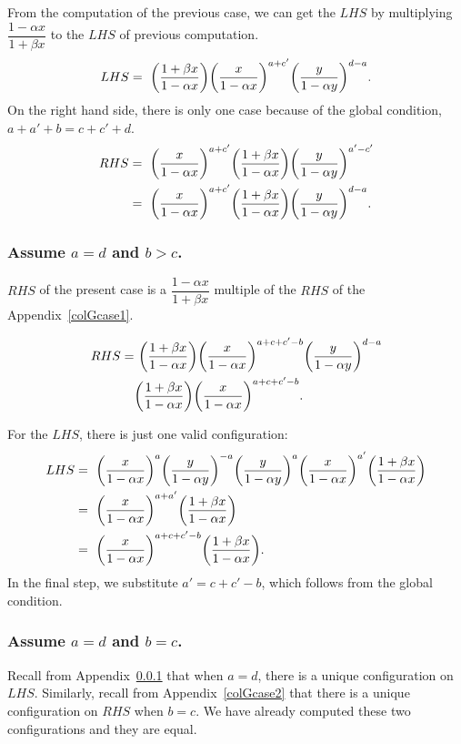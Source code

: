 \documentclass[ALCO, Unicode]{cedram}
\DeclarePairedDelimiter\autobracket{(}{)}
\newcommand{\br}[1]{\autobracket*{#1}}
\begin{document}
From the computation of the previous case, we can get the $LHS$ by multiplying $\dfrac{1-\alpha x}{1+\beta x}$ to the $LHS$ of previous computation.
\[
LHS= \text{ }\br{\dfrac{1+\beta x}{1-\alpha x}} \br{\dfrac{x}{1-\alpha x}}^{a+c'}\br{\dfrac{y}{1-\alpha y}}^{d-a}.
\]
On the right hand side, there is only one case because of the global condition, $a+a'+b=c+c'+d$.
\begin{align*}
RHS=\text{ }&\br{\dfrac{x}{1-\alpha x}}^{a+c'}\br{\dfrac{1+\beta x}{1-\alpha x}}\br{\dfrac{y}{1-\alpha y}}^{a'-c'}\\
    =\text{ }&\br{\dfrac{x}{1-\alpha x}}^{a+c'}\br{\dfrac{1+\beta x}{1-\alpha x}}\br{\dfrac{y}{1-\alpha y}}^{d-a}.
\end{align*}

\subsubsection{Assume \texorpdfstring{$a=d$ and $b>c$}{a=d and b>c}.}
\label{colGcase3}
 $RHS$ of the present case is a $\dfrac{1-\alpha x}{1+\beta x}$ multiple of the $RHS$ of the Appendix~\ref{colGcase1}.


\begin{align*}
RHS=&  \text{ } \br{\dfrac{1+\beta x}{1-\alpha x}} \br{\dfrac{x}{1-\alpha x}}^{a+c+c'-b} \br{\dfrac{y}{1-\alpha y}}^{d-a}\\
 &  \br{\dfrac{1+\beta x}{1-\alpha x}} \br{\dfrac{x}{1-\alpha x}}^{a+c+c'-b}.
\end{align*}

For the $LHS$, there is just one valid configuration:
\begin{align*}
LHS=\text{ }& \br{\dfrac{x}{1-\alpha x}}^{a} \br{\dfrac{y}{1-\alpha y}}^{-a} \br{\dfrac{y}{1-\alpha y}}^{a} \br{\dfrac{x}{1-\alpha x}}^{a'}\br{\dfrac{1+\beta x}{1-\alpha x}}\\
 =\text{ }& \br{\dfrac{x}{1-\alpha x}}^{a+a'} \br{\dfrac{1+\beta x}{1-\alpha x}}\\
 =\text{ }& \br{\dfrac{x}{1-\alpha x}}^{a+c+c'-b} \br{\dfrac{1+\beta x}{1-\alpha x}}.
\end{align*}
In the final step, we substitute $a'=c+c'-b$, which follows from the global condition.

\subsubsection{Assume \texorpdfstring{$a=d$ and $b=c$}{a=d and b=c}.}
Recall from Appendix~\ref{colGcase3} that when $a=d$, there is a unique configuration on $LHS$. 
Similarly, recall from Appendix~\ref{colGcase2} that there is a unique configuration on $RHS$ when $b=c$. We have already computed these two configurations and they are equal.
\end{document}
